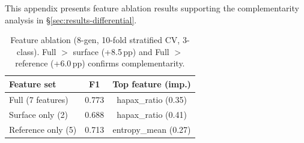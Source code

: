 This appendix presents feature ablation results supporting the complementarity analysis in \S\ref{sec:results-differential}.

\begin{table}[t]
\centering
\footnotesize
\caption{Feature ablation (8-gen, 10-fold stratified CV, 3-class). Full $>$ surface (+8.5\,pp) and Full $>$ reference (+6.0\,pp) confirms complementarity.}
\label{tab:ablation}
\begingroup
\renewcommand{\arraystretch}{1.15}
\begin{tabular}{lcc}
\toprule
\textbf{Feature set} & \textbf{F1} & \textbf{Top feature (imp.)} \\
\midrule
Full (7 features)     & 0.773 & hapax\_ratio (0.35) \\
Surface only (2)      & 0.688 & hapax\_ratio (0.41) \\
Reference only (5)    & 0.713 & entropy\_mean (0.27) \\
\bottomrule
\end{tabular}
\endgroup
\end{table}
